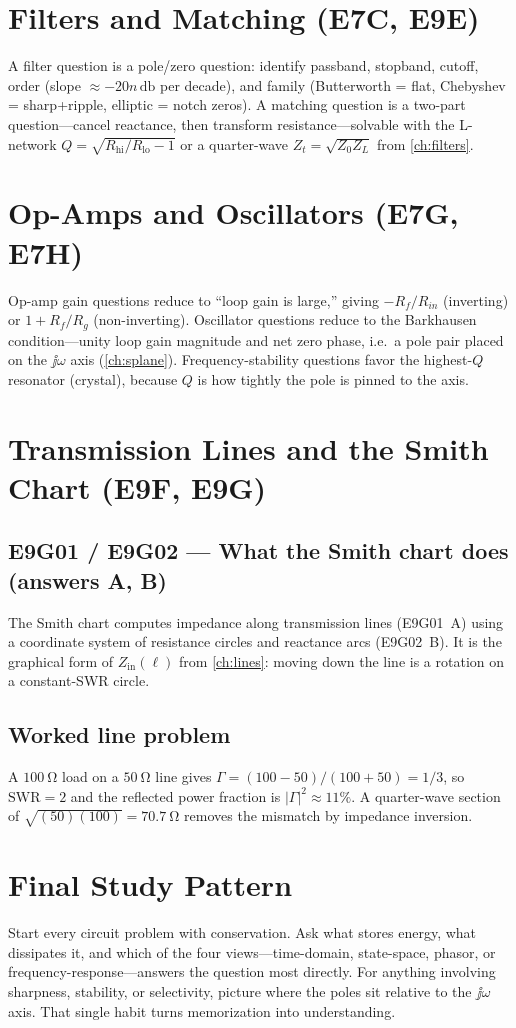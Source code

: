 \section{Filters and Matching (E7C, E9E)}
A filter question is a pole/zero question: identify passband, stopband, cutoff,
order (slope \(\approx-20n\,\si{\decibel}\) per decade), and family
(Butterworth = flat, Chebyshev = sharp+ripple, elliptic = notch zeros). A
matching question is a two-part question---cancel reactance, then transform
resistance---solvable with the L-network \(Q=\sqrt{R_{\text{hi}}/R_{\text{lo}}-1}\)
or a quarter-wave \(Z_t=\sqrt{Z_0Z_L}\) from \cref{ch:filters}.

\section{Op-Amps and Oscillators (E7G, E7H)}
Op-amp gain questions reduce to ``loop gain is large,'' giving
\(-R_f/R_{in}\) (inverting) or \(1+R_f/R_g\) (non-inverting). Oscillator questions
reduce to the Barkhausen condition---unity loop gain magnitude and net zero
phase, i.e.\ a pole pair placed on the \(\jj\omega\) axis
(\cref{ch:splane}). Frequency-stability questions favor the highest-\(Q\)
resonator (crystal), because \(Q\) is how tightly the pole is pinned to the axis.

\section{Transmission Lines and the Smith Chart (E9F, E9G)}

\subsection*{E9G01 / E9G02 --- What the Smith chart does (answers A, B)}
The Smith chart computes impedance along transmission lines (E9G01~A) using a
coordinate system of resistance circles and reactance arcs (E9G02~B). It is the
graphical form of \(Z_{\mathrm{in}}(\ell)\) from \cref{ch:lines}: moving down the
line is a rotation on a constant-SWR circle.

\subsection*{Worked line problem}
A \(\SI{100}{\ohm}\) load on a \(\SI{50}{\ohm}\) line gives
\(\Gamma=(100-50)/(100+50)=1/3\), so \(\mathrm{SWR}=2\) and the reflected power
fraction is \(|\Gamma|^2\approx11\%\). A quarter-wave section of
\(\sqrt{(50)(100)}=\SI{70.7}{\ohm}\) removes the mismatch by impedance inversion.

\section{Final Study Pattern}
Start every circuit problem with conservation. Ask what stores energy, what
dissipates it, and which of the four views---time-domain, state-space, phasor,
or frequency-response---answers the question most directly. For anything
involving sharpness, stability, or selectivity, picture where the poles sit
relative to the \(\jj\omega\) axis. That single habit turns memorization into
understanding.

